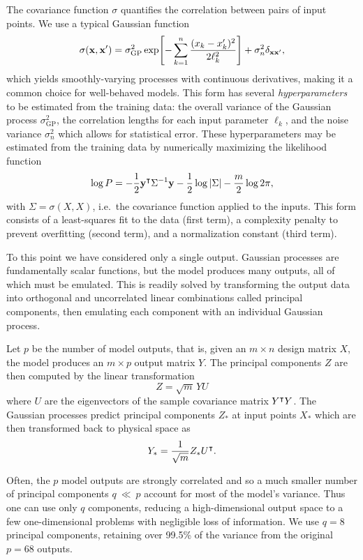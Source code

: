 \documentclass[aps,prc,reprint,amsmath,nofootinbib,superscriptaddress]{revtex4-1}
\begin{document}
The covariance function $\sigma$ quantifies the correlation between pairs of input points.
We use a typical Gaussian function
\begin{equation}
  \sigma(\mathbf x, \mathbf x') = \sigma_\text{GP}^2 \exp\Biggl[ -\sum_{k=1}^n \frac{(x_k - x'_k)^2}{2\ell_k^2} \Biggr] + \sigma_n^2\delta_{\mathbf x\mathbf x'},
\end{equation}
which yields smoothly-varying processes with continuous derivatives, making it a common choice for well-behaved models.
This form has several \emph{hyperparameters} to be estimated from the training data:
the overall variance of the Gaussian process $\sigma_\text{GP}^2$,
the correlation lengths for each input parameter $\ell_k$,
and the noise variance $\sigma_n^2$ which allows for statistical error.
These hyperparameters may be estimated from the training data by numerically maximizing the likelihood function
\begin{equation}
  \log P = -\frac{1}{2} \mathbf y^\intercal \Sigma^{-1} \mathbf y - \frac{1}{2} \log |\Sigma| - \frac{m}{2} \log 2\pi,
\end{equation}
with $\Sigma = \sigma(X, X)$, i.e.\ the covariance function applied to the inputs.
This form consists of a least-squares fit to the data (first term), a complexity penalty to prevent overfitting (second term), and a normalization constant (third term).

To this point we have considered only a single output.
Gaussian processes are fundamentally scalar functions, but the model produces many outputs, all of which must be emulated.
This is readily solved by transforming the output data into orthogonal and uncorrelated linear combinations called principal components, then emulating each component with an individual Gaussian process.

Let $p$ be the number of model outputs, that is, given an $m \times n$ design matrix $X$, the model produces an $m \times p$ output matrix $Y$.
The principal components $Z$ are then computed by the linear transformation
\begin{equation}
  Z = \sqrt m \, Y U
\end{equation}
where $U$ are the eigenvectors of the sample covariance matrix $Y^\intercal Y$.
The Gaussian processes predict principal components $Z_*$ at input points $X_*$ which are then transformed back to physical space as
\begin{equation}
  Y_* = \frac{1}{\sqrt m} Z_* U^\intercal.
\end{equation}

Often, the $p$ model outputs are strongly correlated and so a much smaller number of principal components $q~\ll~p$ account for most of the model's variance.
Thus one can use only $q$ components, reducing a high-dimensional output space to a few one-dimensional problems with negligible loss of information.
We use $q = 8$ principal components, retaining over 99.5\% of the variance from the original $p = 68$ outputs.
\end{document}
